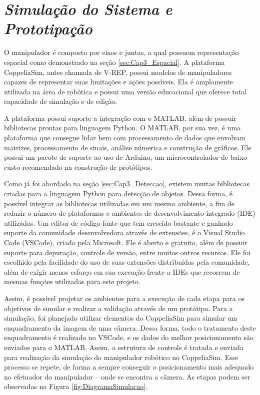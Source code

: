 \section{\textit{Simulação do Sistema e Prototipação}}\label{sec:Cap3_Simulador}

O manipulador é composto por eixos e juntas, a qual possuem representação espacial como demonstrado na seção \ref{sec:Cap3_Espacial}. A plataforma CoppeliaSim, antes chamada de V-REP, possui modelos de manipuladores capazes de representar suas limitações e ações possíveis. Ela é amplamente utilizada na área de robótica e possui uma versão educacional que oferece total capacidade de simulação e de edição.

A plataforma possui suporte a integração com o MATLAB, além de possuir bibliotecas prontas para linguagem Python. O MATLAB, por sua vez, é uma plataforma que consegue lidar bem com processamento de dados que envolvam matrizes, processamento de sinais, análise númerica e construção de gráficos. Ele possui um pacote de suporte ao uso de Arduino, um microcontrolador de baixo custo recomendado na construção de protótipos.

Como já foi abordado na seção \ref{sec:Cap3_Deteccao}, existem muitas bibliotecas criadas para a linguagem Python para detecção de objetos. Dessa forma, é possível integrar as bibliotecas utilizadas em um mesmo ambiente, a fim de reduzir o número de plataformas e ambientes de desenvolvimento integrado (IDE) utilizados. Um editor de código-fonte que tem crescido bastante e ganhado suporte da comunidade desenvolvedora através de extensões, é o  Visual Studio Code (VSCode), criado pela Microsoft. Ele é aberto e gratuito, além de possuir suporte para depuração, controle de versão, entre muitos outros recursos. Ele foi escolhido pela facilidade do uso de suas extensões distribuídas pela comunidade, além de exigir menos esforço em sua execução frente a IDEs que recorrem de mesmas funções utilizadas para este projeto.

Assim, é possível projetar os ambientes para a execução de cada etapa para os objetivos de simular e realizar a validação através de um protótipo. Para a simulação, foi planejado utilizar elementos do CoppeliaSim para simular um enquadramento da imagem de uma câmera. Dessa forma, todo o tratamento deste enquadramento é realizado no VSCode, e os dados do melhor posicionamento são enviados para o MATLAB. Assim, a estrutura de controle é tratada e enviada para realização da simulação do manipulador robótico no CoppeliaSim. Esse processo se repete, de forma a sempre conseguir o posicionamento mais adequado no efetuador do manipulador – onde se encontra a câmera. As etapas podem ser observadas na Figura \ref{fig:DiagramaSimulacao}.


